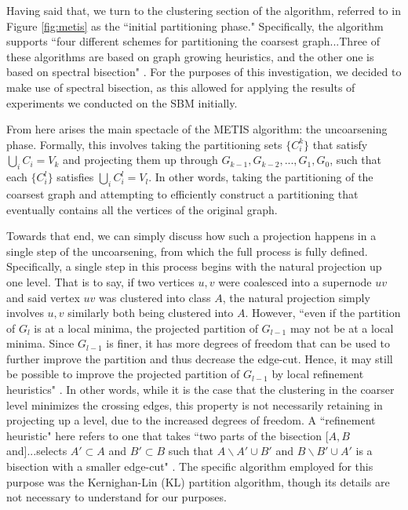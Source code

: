 \documentclass[journal]{IEEEtran}
\begin{document}
Having said that, we turn to the clustering section of the algorithm, referred to in Figure \ref{fig:metis} as the ``initial partitioning phase." Specifically, the algorithm supports ``four different schemes for partitioning the coarsest graph...Three of these algorithms are based on graph growing heuristics, and the other one is based on spectral bisection" \cite{metis}. For the purposes of this investigation, we decided to make use of spectral bisection, as this allowed for applying the results of experiments we conducted on the SBM initially. 

From here arises the main spectacle of the METIS algorithm: the uncoarsening phase. Formally, this involves taking the partitioning sets $\{C^k_i\}$ that satisfy $\bigcup_i C_i = V_k$ and projecting them up through $G_{k-1},G_{k-2},...,G_1,G_0$, such that each $\{C^l_i\}$ satisfies $\bigcup_i C^l_i = V_l$. In other words, taking the partitioning of the coarsest graph and attempting to efficiently construct a partitioning that eventually contains all the vertices of the original graph.

Towards that end, we can simply discuss how such a projection happens in a single step of the uncoarsening, from which the full process is fully defined. Specifically, a single step in this process begins with the natural projection up one level. That is to say, if two vertices $u,v$ were coalesced into a supernode $uv$ and said vertex $uv$ was clustered into class $A$, the natural projection simply involves $u,v$ similarly both being clustered into $A$. However, ``even if the partition of $G_l$ is at a local minima, the projected partition of $G_{l−1}$ may not be at a local minima. Since $G_{l−1}$ is finer, it has more degrees of freedom that can be used to further improve the partition and thus decrease the edge-cut. Hence, it may still be possible to improve the projected partition of $G_{l−1}$ by local refinement heuristics" \cite{metis}. In other words, while it is the case that the clustering in the coarser level minimizes the crossing edges, this property is not necessarily retaining in projecting up a level, due to the increased degrees of freedom. A ``refinement heuristic" here refers to one that takes ``two parts of the bisection [$A, B$ and]...selects $A'\subset A$ and $B'\subset B$ such that $A\backslash A' \cup B'$ and $B\backslash B' \cup A'$ is a bisection with a smaller edge-cut" \cite{metis}. The specific algorithm employed for this purpose was the Kernighan-Lin (KL) partition algorithm, though its details are not necessary to understand for our purposes.
\end{document}
